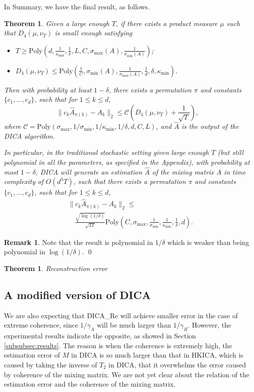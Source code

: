 \documentclass[twoside]{article}
\newtheorem{thm}[lemma]{Theorem}
\theoremstyle{definition}
\newtheorem{remark}[lemma]{Remark}
\begin{document}
In Summary, we have the final result, as follows.
\begin{thm}
\label{thm:finalRes}
 Given a large enough $T$, if there exists a product measure $\mu$  such that  $D_4(\mu, \nu_T)$ is small enough satisfying
\begin{itemize}
\vspace{-3mm}
\item $T \ge \text{Poly}(d, \frac{1}{\kappa_{\min}}, \frac{1}{\delta}, L, C, \sigma_{\max}(A), \frac{1}{\sigma_{\min}(A)})$;
\item $D_4(\mu, \nu_T) \le \text{Poly}(\frac{1}{C},  \sigma_{\min}(A),  \frac{1}{\sigma_{\max}(A)},\frac{1}{d}, \delta, \kappa_{\min})$.
\end{itemize}
\vspace{-2mm}
Then with probability at least $1-\delta$, there exists a permutation $\pi$ and constants $\{c_1,\ldots,c_d\}$, such that for $1\le k\le d$,
\[
\| c_k\widehat{A}_{\pi(k)} - A_k\|_2 \le \mathcal{C}\left(D_4(\mu, \nu_T)+\frac{1}{\sqrt{T}}\right),
\]
where $\mathcal{C} = \text{Poly}(\sigma_{\max}, 1/\sigma_{\min}, 1/\kappa_{\min},1/\delta, d, C, L)$, and $\widehat{A}$ is the output of the DICA algorithm.

In particular, in the traditional stochastic setting given large enough $T$ (but still polynomial in all the parameters, as specified in the Appendix),
 with probability at most $1-\delta$, 
 DICA will generate an estimation $\widehat{A}$ of the mixing matrix $A$ in
 time complexity of $O(d^3T)$, 
 such that there exists a permutation $\pi$ and constants $\{c_1,\ldots,c_d\}$, such that for $1\le k\le d$,
\begin{align*}
& \| c_k\widehat{A}_{\pi(k)} - A_k\|_2 \le \\
& \quad\frac{\sqrt{\log(1/\delta)}}{\sqrt{2T}}\text{Poly}(C, \sigma_{\max}, \frac{1}{\sigma_{\min}}, \frac{1}{\kappa_{\min}},\frac{1}{\delta}, d).
\end{align*}
\end{thm}
\begin{remark}
Note that the result is polynomial in $1/\delta$ which is weaker than being polynomial in $\log(1/\delta)$. \qed
\end{remark}
\begin{thm}
Reconstruction error
\end{thm}
\subsection{A modified version of DICA}
\label{subsec:modifiedDICA}
We are also expecting that DICA\_Re will achieve smaller error in the case of extreme coherence, since $1/\gamma_A$ will be much larger than $1/\gamma_R$. 
However, the experimental results indicate the opposite, as showed in Section \ref{subsubsec:results}.  
The reason is when the coherence is extremely high, the estimation error of $M$ in DICA is so much larger than that in HKICA, 
which is caused by taking the inverse of $T_2$ in DICA, 
that it overwhelms the error caused by coherence of the mixing matrix.
We are not yet clear about the relation of the estimation error and the coherence of the mixing matrix.
\end{document}
